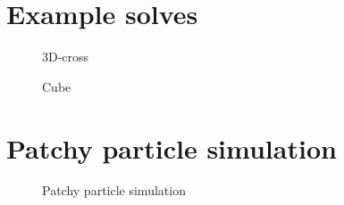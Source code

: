 \section{Example solves}

\begin{figure}[h]
    \centering
    \caption{3D-cross}
\end{figure}

\begin{figure}[h]
    \centering
    \caption{Cube}
\end{figure}


\section{Patchy particle simulation}

\begin{figure}[h]
    \centering
    \caption{Patchy particle simulation}
\end{figure}